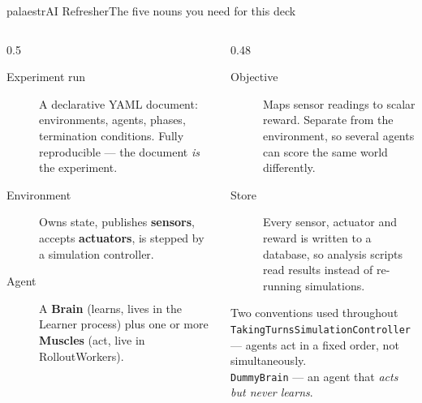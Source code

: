 \documentclass[aspectratio=169,9pt]{beamer}
\newcommand{\code}[1]{{\small\texttt{#1}}}
\newcommand{\gold}[1]{{\color{cslaeaglegold}\textbf{#1}}}
\begin{document}
\begin{frame}{palaestrAI Refresher}{The five nouns you need for this deck}
  \begin{columns}[T,onlytextwidth]
    \begin{column}{0.5\textwidth}
      \small
      \begin{description}
        \item[Experiment run] A declarative YAML document: environments,
              agents, phases, termination conditions. Fully reproducible ---
              the document \emph{is} the experiment.
        \item[Environment] Owns state, publishes \gold{sensors}, accepts
              \gold{actuators}, is stepped by a simulation controller.
        \item[Agent] A \gold{Brain} (learns, lives in the Learner process)
              plus one or more \gold{Muscles} (act, live in RolloutWorkers).
      \end{description}
    \end{column}
    \begin{column}{0.48\textwidth}
      \small
      \begin{description}
        \item[Objective] Maps sensor readings to scalar reward. Separate
              from the environment, so several agents can score the same
              world differently.
        \item[Store] Every sensor, actuator and reward is written to a
              database, so analysis scripts read results instead of
              re-running simulations.
      \end{description}
      \vskip6pt
      \begin{alertblock}{Two conventions used throughout}
        \small
        \code{TakingTurnsSimulationController} --- agents act in a fixed
        order, not simultaneously.\\[3pt]
        \code{DummyBrain} --- an agent that \emph{acts but never learns}.
      \end{alertblock}
    \end{column}
  \end{columns}
\end{frame}
\end{document}
